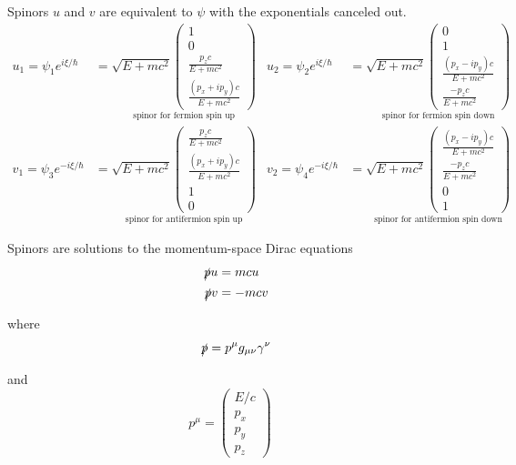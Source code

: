 Spinors $u$ and $v$ are equivalent to $\psi$ with the exponentials canceled out.
\begin{align*}
u_1=\psi_1e^{i\xi/\hbar}&=\underset{\text{spinor for fermion spin up}}
{
\sqrt{E+mc^2}
\begin{pmatrix}1\\0\\\frac{p_zc}{E+mc^2}\\\frac{(p_x+ip_y)c}{E+mc^2}\end{pmatrix}
}
&
u_2=\psi_2e^{i\xi/\hbar}&=\underset{\text{spinor for fermion spin down}}
{
\sqrt{E+mc^2}
\begin{pmatrix}0\\1\\\frac{(p_x-ip_y)c}{E+mc^2}\\\frac{-p_zc}{E+mc^2}\end{pmatrix}
}
\\[1ex]
v_1=\psi_3e^{-i\xi/\hbar}&=\underset{\text{spinor for antifermion spin up}}
{
\sqrt{E+mc^2}
\begin{pmatrix}\frac{p_zc}{E+mc^2}\\\frac{(p_x+ip_y)c}{E+mc^2}\\1\\0\end{pmatrix}
}
&
v_2=\psi_4e^{-i\xi/\hbar}&=\underset{\text{spinor for antifermion spin down}}
{
\sqrt{E+mc^2}
\begin{pmatrix}\frac{(p_x-ip_y)c}{E+mc^2}\\\frac{-p_zc}{E+mc^2}\\0\\1\end{pmatrix}
}
\end{align*}

Spinors are solutions to the momentum-space Dirac equations
\begin{align*}
\slashed pu&=mcu
\\
\slashed pv&=-mcv
\end{align*}

where
\begin{equation*}
\slashed p=p^\mu g_{\mu\nu}\gamma^\nu
\end{equation*}

and
\begin{equation*}
p^\mu=\begin{pmatrix}E/c\\p_x\\p_y\\p_z\end{pmatrix}\quad
\end{equation*}

